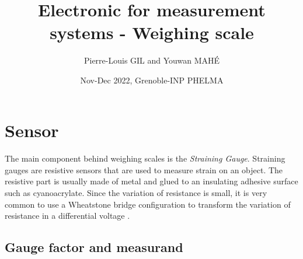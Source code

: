 \documentclass{article}[12pt]
\title{Electronic for measurement systems - Weighing scale}
\author{Pierre-Louis GIL and Youwan MAHÉ}
\date{Nov-Dec 2022, Grenoble-INP PHELMA}
\begin{document}
\maketitle
\tableofcontents
\newpage

\section{Sensor}
\paragraph{}
The main component behind weighing scales is the \emph{Straining Gauge}. Straining gauges are resistive sensors that are used to measure strain on an object. The resistive part is usually made of metal and glued to an insulating adhesive surface such as cyanoacrylate. Since the variation of resistance is  small, it is very common to use a Wheatstone bridge configuration to transform the variation of resistance in a differential voltage \cite{LeBerre-2016}.
\subsection{Gauge factor and measurand}
\end{document}
